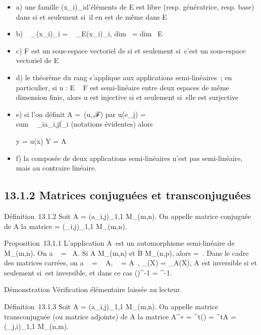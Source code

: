 \documentclass[]{article}
\begin{document}
\begin{itemize}
\item
  a) une famille (x_i)_i\inI d'éléments de E est libre
  (resp. génératrice, resp. base) dans \checkE si et
  seulement si~il en est de même dans E
\item
  b) \mathrmrg~
  _\checkE(x_i)_i\inI
  = \mathrmrg~
  _E(x_i)_i\inI, dim~
  \checkE = dim~ E
\item
  c) F est un sous-espace vectoriel de \checkE si et
  seulement si~c'est un sous-espace vectoriel de E
\item
  d) le théorème du rang s'applique aux applications semi-linéaires~; en
  particulier, si u : E \rightarrow~ F est semi-linéaire entre deux espaces de même
  dimension finie, alors u est injective si et seulement si~elle est
  surjective
\item
  e) si l'on définit A =\
  \mathrmMat (u,,ℱ) par u(e_j)
  = \\sum ~
  _ia_i,jf_i (notations évidentes) alors

  y = u(x) \Leftrightarrow Y =
  A\overlineX
\item
  f) la composée de deux applications semi-linéaires n'est pas
  semi-linéaire, mais au contraire linéaire.
\end{itemize}

\subsection{13.1.2 Matrices conjuguées et transconjuguées}

Définition~13.1.2 Soit A = (a_i,j)_1\leqi\leqm,1\leqj\leqn \in
M_(m,n). On appelle matrice conjuguée de A la matrice
\overlineA =
(\overlinea_i,j)_1\leqi\leqm,1\leqj\leqn \in
M_(m,n).

Proposition~13.1.1 L'application
A\mapsto~\overlineA est un
automorphisme semi-linéaire de M_(m,n). On a
\mathrmrg\overlineA~
= \mathrmrg~A. Si A \in
M_(m,n) et B \in M_(n,p), alors
\overlineAB =
\overlineA\,\overlineB.
Dans le cadre des matrices carrées, on a
~
\overlineA =
\overline{}~
A,
\overlineA~
=
\overline{}A~,
\chi_\overlineA(X) =
\overline\chi_A(X), A est inversible si et
seulement si~\overlineA est inversible, et dans ce
cas (\overlineA)^-1 =
\overlineA^-1.

Démonstration Vérification élémentaire laissée au lecteur.

Définition~13.1.3 Soit A = (a_i,j)_1\leqi\leqm,1\leqj\leqn \in
M_(m,n). On appelle matrice transconjuguée (ou matrice
adjointe) de A la matrice A^∗ =
^t(\overlineA) =
\overline^tA =
(\overlinea_j,i)_1\leqi\leqm,1\leqj\leqn \in
M_(n,m).
\end{document}
